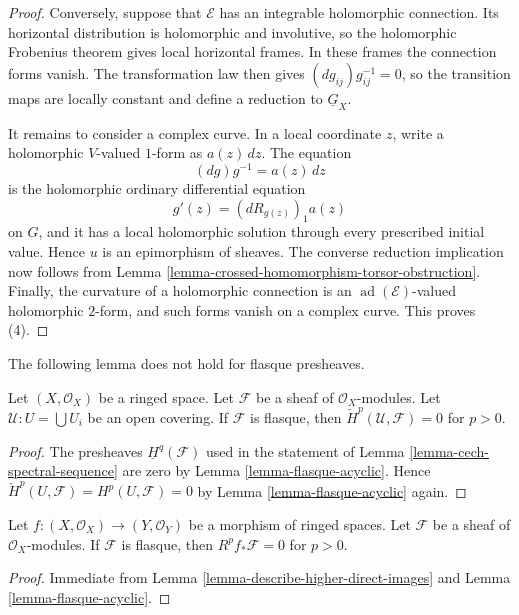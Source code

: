 \begin{proof}
Conversely, suppose that $\mathcal E$ has an integrable holomorphic
connection. Its horizontal distribution is holomorphic and involutive, so
the holomorphic Frobenius theorem gives local horizontal frames. In these
frames the connection forms vanish. The transformation law then gives
$(dg_{ij})g_{ij}^{-1}=0$, so the transition maps are locally constant and
define a reduction to $\underline G_X$.

It remains to consider a complex curve. In a local coordinate $z$, write a
holomorphic $V$-valued $1$-form as $a(z)\,dz$. The equation
$$
(dg)g^{-1}=a(z)\,dz
$$
is the holomorphic ordinary differential equation
$$
g'(z)=(dR_{g(z)})_1a(z)
$$
on $G$, and it has a local holomorphic solution through every prescribed
initial value. Hence $u$ is an epimorphism of sheaves. The converse reduction
implication now follows from
Lemma \ref{lemma-crossed-homomorphism-torsor-obstruction}. Finally, the
curvature of a holomorphic connection is an
$\operatorname{ad}(\mathcal E)$-valued holomorphic $2$-form, and such forms
vanish on a complex curve. This proves (4).
\end{proof}

\noindent
The following lemma does not hold for flasque presheaves.

\begin{lemma}
\label{lemma-flasque-acyclic-cech}
Let $(X, \mathcal{O}_X)$ be a ringed space.
Let $\mathcal{F}$ be a sheaf of $\mathcal{O}_X$-modules.
Let $\mathcal{U} : U = \bigcup U_i$ be an open covering.
If $\mathcal{F}$ is flasque, then
$\check{H}^p(\mathcal{U}, \mathcal{F}) = 0$ for $p > 0$.
\end{lemma}

\begin{proof}
The presheaves $\underline{H}^q(\mathcal{F})$ used in the statement
of Lemma \ref{lemma-cech-spectral-sequence} are zero by
Lemma \ref{lemma-flasque-acyclic}.
Hence $\check{H}^p(U, \mathcal{F}) = H^p(U, \mathcal{F}) = 0$
by Lemma \ref{lemma-flasque-acyclic} again.
\end{proof}

\begin{lemma}
\label{lemma-flasque-acyclic-pushforward}
Let $f : (X, \mathcal{O}_X) \to (Y, \mathcal{O}_Y)$ be a morphism
of ringed spaces. Let $\mathcal{F}$ be a sheaf of $\mathcal{O}_X$-modules.
If $\mathcal{F}$ is flasque, then $R^pf_*\mathcal{F} = 0$ for $p > 0$.
\end{lemma}

\begin{proof}
Immediate from
Lemma \ref{lemma-describe-higher-direct-images} and
Lemma \ref{lemma-flasque-acyclic}.
\end{proof}

